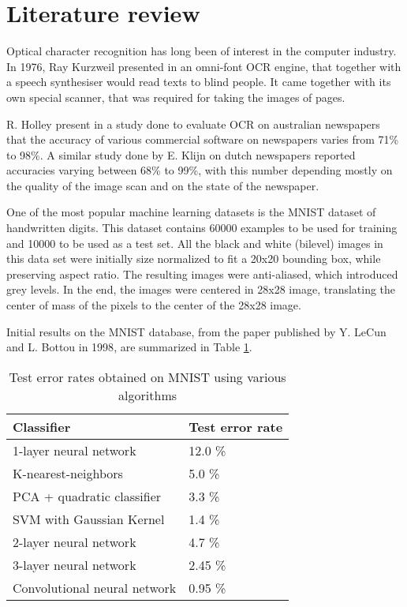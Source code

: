 \section{Literature review}
\label{sec:lit_rev}
Optical character recognition has long been of interest in the computer industry. In 1976, Ray Kurzweil presented in \cite{schantz1982history} an omni-font OCR engine, that together with a speech synthesiser would read texts to blind people. It came together with its own special scanner, that was required for taking the images of pages. 

R. Holley present in a study\cite{Holley_2009} done to evaluate OCR on australian newspapers that the accuracy of various commercial software on newspapers varies from 71\% to 98\%. A similar study done by E. Klijn on dutch newspapers reported accuracies varying between 68\% to 99\%, with this number depending mostly on the quality of the image scan and on the state of the newspaper. 

One of the most popular machine learning datasets is the MNIST dataset of handwritten digits\cite{lecun1998mnist}. This dataset contains 60000 examples to be used for training and 10000 to be used as a test set. All the black and white (bilevel) images in this data set were initially size normalized to fit a 20x20 bounding box, while preserving aspect ratio. The resulting images were anti-aliased, which introduced grey levels. In the end, the images were centered in 28x28 image, translating the center of mass of the pixels to the center of the 28x28 image. 

Initial results on the MNIST database, from the paper published by Y. LeCun and L. Bottou in 1998\cite{Lecun_1998}, are summarized in Table \ref{table:mnist_results}. 

\begin{table}[h]
\caption{Test error rates obtained on MNIST using various algorithms}
\label{table:mnist_results}
\begin{tabular}{ll}
\hline
Classifier                   & Test error rate \\ \hline
1-layer neural network       & 12.0 \%           \\
K-nearest-neighbors          & 5.0  \%           \\
PCA + quadratic classifier   & 3.3  \%          \\
SVM with Gaussian Kernel     & 1.4  \%           \\
2-layer neural network       & 4.7  \%           \\
3-layer neural network       & 2.45 \%           \\
Convolutional neural network & 0.95 \%           \\ \hline
\end{tabular}
\end{table}

